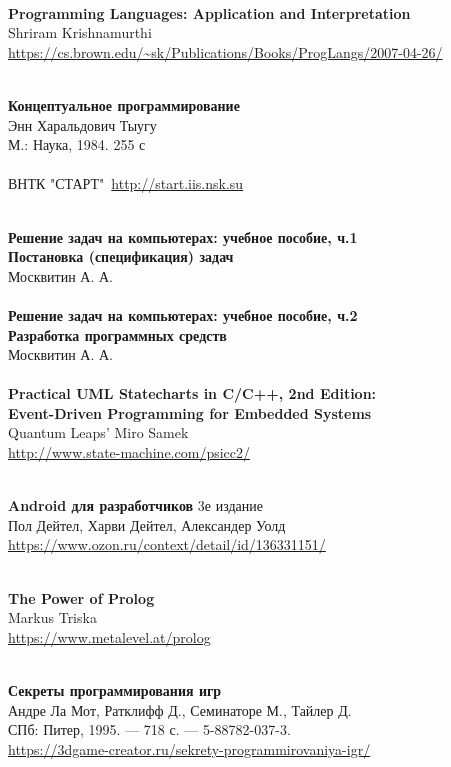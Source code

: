 \begin{thebibliography}{99}
\clearpage
{}\ \\
\textbf{Programming Languages: Application and Interpretation}\\
Shriram Krishnamurthi\\
\url{https://cs.brown.edu/~sk/Publications/Books/ProgLangs/2007-04-26/}

\clearpage
{}\ \\
\textbf{Концептуальное программирование}\\
Энн Харальдович Тыугу\\
М.: Наука, 1984. 255 с\\
\ \\
ВНТК "СТАРТ"\ \url{http://start.iis.nsk.su}

\clearpage
{}\ \\
\textbf{Решение задач на компьютерах: учебное пособие, ч.1\\
Постановка (спецификация) задач }\\
Москвитин А. А.\\

\clearpage
{}\ \\
\textbf{Решение задач на компьютерах: учебное пособие, ч.2\\
Разработка программных средств}\\
Москвитин А. А.\\

\clearpage
{}\ \\
\textbf{Practical UML Statecharts in C/C++, 2nd Edition:\\
Event-Driven Programming for Embedded Systems}\\
Quantum Leaps' Miro Samek\\
\url{http://www.state-machine.com/psicc2/}

\clearpage
{}\ \\
\textbf{Android для разработчиков} 3е издание\\
Пол Дейтел, Харви Дейтел, Александер Уолд\\
\url{https://www.ozon.ru/context/detail/id/136331151/}

\clearpage
{}\ \\
\textbf{The Power of Prolog}\\
Markus Triska\\
\url{https://www.metalevel.at/prolog}

\clearpage
{}\ \\
\textbf{Секреты программирования игр}\\
Андре Ла Мот, Ратклифф Д., Семинаторе М., Тайлер Д.\\
СПб: Питер, 1995. — 718 с. — 5-88782-037-3.\\
\url{https://3dgame-creator.ru/sekrety-programmirovaniya-igr/}

\end{thebibliography}
